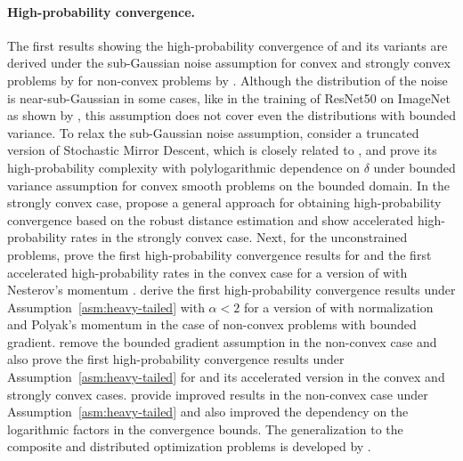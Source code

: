 \documentclass{article}
\begin{document}
\paragraph{High-probability convergence.} The first results showing the high-probability convergence of  and its variants are derived under the sub-Gaussian noise assumption for convex and strongly convex problems by \citet{nemirovski2009robust, ghadimi2012optimal, harvey2019simple} for non-convex problems by \citet{li2020high}. Although the distribution of the noise is near-sub-Gaussian in some cases, like in the training of ResNet50 \citep{he2016deep} on ImageNet \citep{russakovsky2015imagenet} as shown by \citet{zhang2020adaptive}, this assumption does not cover even the distributions with bounded variance. To relax the sub-Gaussian noise assumption, \citet{nazin2019algorithms} consider a truncated version of Stochastic Mirror Descent, which is closely related to , and prove its high-probability complexity with polylogarithmic dependence on $\delta$ under bounded variance assumption for convex smooth problems on the bounded domain. In the strongly convex case, \citet{davis2021low} propose a general approach for obtaining high-probability convergence based on the robust distance estimation and show accelerated high-probability rates in the strongly convex case. Next, for the unconstrained problems, \citet{gorbunov2020stochastic} prove the first high-probability convergence results for  and the first accelerated high-probability rates in the convex case for a version of  with Nesterov's momentum \citep{nesterov1983method}.  \citet{cutkosky2021high} derive the first high-probability convergence results under Assumption~\ref{asm:heavy-tailed} with $\alpha < 2$ for a version of  with normalization and Polyak's momentum \citep{polyak1964some} in the case of non-convex problems with bounded gradient. \citet{sadiev2023high} remove the bounded gradient assumption in the non-convex case and also prove the first high-probability convergence results under Assumption~\ref{asm:heavy-tailed} for  and its accelerated version in the convex and strongly convex cases. \citet{nguyen2023improved} provide improved results in the non-convex case under Assumption~\ref{asm:heavy-tailed} and also improved the dependency on the logarithmic factors in the convergence bounds. The generalization to the composite and distributed optimization problems is developed by \citet{gorbunov2023high}. 
\end{document}
